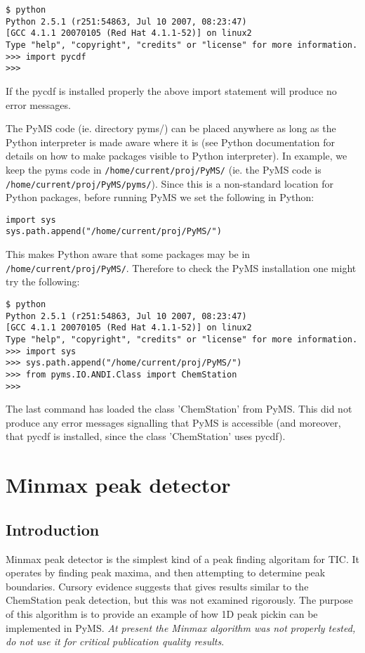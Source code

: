 \begin{verbatim}
$ python
Python 2.5.1 (r251:54863, Jul 10 2007, 08:23:47)
[GCC 4.1.1 20070105 (Red Hat 4.1.1-52)] on linux2
Type "help", "copyright", "credits" or "license" for more information.
>>> import pycdf
>>>
\end{verbatim}

If the pycdf is installed properly the above import statement will produce
no error messages.

The PyMS code (ie. directory pyms/) can be placed anywhere as long as the
Python interpreter is made aware where it is (see Python documentation
for details on how to make packages visible to Python interpreter). In
example, we keep the pyms code in {\tt /home/current/proj/PyMS/} (ie. the
PyMS code is {\tt /home/current/proj/PyMS/pyms/}). Since this is a
non-standard location for Python packages, before running PyMS we set the
following in Python:

\begin{verbatim}
import sys
sys.path.append("/home/current/proj/PyMS/")
\end{verbatim}

This makes Python aware that some packages may be in {\tt
/home/current/proj/PyMS/}. Therefore to check the PyMS installation one
might try the following:

\begin{verbatim}
$ python
Python 2.5.1 (r251:54863, Jul 10 2007, 08:23:47)
[GCC 4.1.1 20070105 (Red Hat 4.1.1-52)] on linux2
Type "help", "copyright", "credits" or "license" for more information.
>>> import sys
>>> sys.path.append("/home/current/proj/PyMS/")
>>> from pyms.IO.ANDI.Class import ChemStation
>>>
\end{verbatim}

The last command has loaded the class 'ChemStation' from PyMS. This did not
produce any error messages signalling that PyMS is accessible (and moreover,
that pycdf is installed, since the class 'ChemStation' uses pycdf).

\section{Minmax peak detector}

\subsection{Introduction}

Minmax peak detector is the simplest kind of a peak finding algoritam for
TIC. It operates by finding peak maxima, and then attempting to determine
peak boundaries. Cursory evidence suggests that gives results similar to
the ChemStation peak detection, but this was not examined rigorously.
The purpose of this algorithm is to provide an example of how 1D peak
pickin can be implemented in PyMS. {\em At present the Minmax algorithm
was not properly tested, do not use it for critical publication quality
results}.

